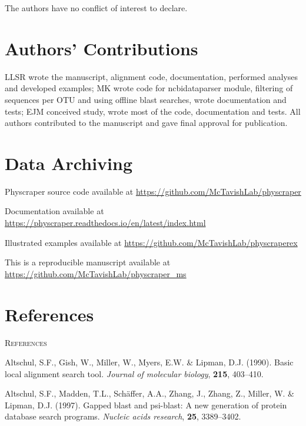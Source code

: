 \documentclass[]{article}
\begin{document}
The authors have no conflict of interest to declare.

\hypertarget{authors-contributions}{%
\section{Authors' Contributions}\label{authors-contributions}}

LLSR wrote the manuscript, alignment code, documentation, performed analyses and developed examples; MK wrote code for ncbidataparser module, filtering of sequences per OTU and using offline blast searches, wrote documentation and tests; EJM conceived study, wrote most of the code, documentation and tests.
All authors contributed to the manuscript and gave final approval for publication.

\hypertarget{data-archiving}{%
\section{Data Archiving}\label{data-archiving}}

Physcraper source code available at \url{https://github.com/McTavishLab/physcraper}

Documentation available at \url{https://physcraper.readthedocs.io/en/latest/index.html}

Illustrated examples available at \url{https://github.com/McTavishLab/physcraperex}

This is a reproducible manuscript available at \url{https://github.com/McTavishLab/physcraper_ms}

\newpage

\hypertarget{references}{%
\section{References}\label{references}}

\newpage
\begin{center}
\textsc{References}
\end{center}

\hypertarget{refs}{}
\leavevmode\hypertarget{ref-altschul1990basic}{}%
Altschul, S.F., Gish, W., Miller, W., Myers, E.W. \& Lipman, D.J. (1990). Basic local alignment search tool. \emph{Journal of molecular biology}, \textbf{215}, 403--410.

\leavevmode\hypertarget{ref-altschul1997gapped}{}%
Altschul, S.F., Madden, T.L., Schäffer, A.A., Zhang, J., Zhang, Z., Miller, W. \& Lipman, D.J. (1997). Gapped blast and psi-blast: A new generation of protein database search programs. \emph{Nucleic acids research}, \textbf{25}, 3389--3402.
\end{document}
